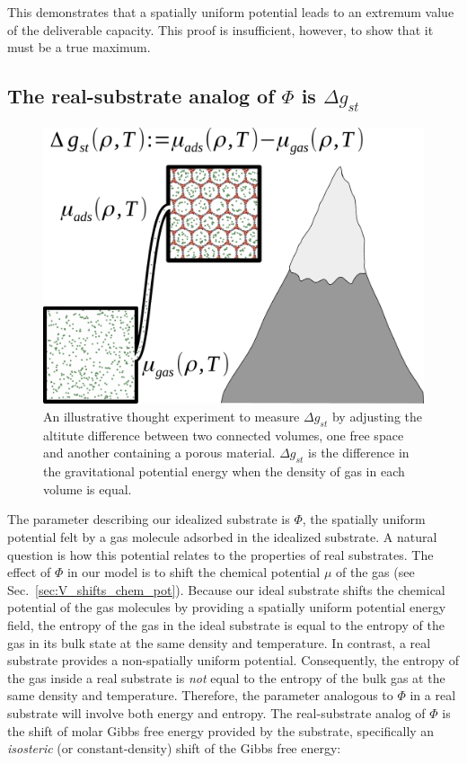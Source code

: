 \documentclass[twoside,twocolumn,9pt]{article}
\newcommand\V{\Phi}
\newcommand\gst{\ensuremath{\Delta g_{st}}}
\begin{document}
This demonstrates that a spatially uniform potential leads to an extremum value
of the deliverable capacity. This proof is insufficient, however, to show that
it must be a true maximum.

\subsection{The real-substrate analog of $\V$ is $\gst$}
\label{sec:phi-is-delta-g}
\begin{figure}
    \centering
    \includegraphics[width=\columnwidth]{g_st_simple.pdf}
    \caption{An illustrative thought experiment to measure $\gst$ by adjusting the altitute difference between two connected volumes, one free space and another containing a porous material.
    $\gst$ is the difference in the gravitational potential energy when the density of gas in each volume is equal.
    }
    \label{fig:delta-G-cartoon}
\end{figure}

The parameter describing our idealized substrate is $\V$, the spatially uniform
potential felt by a gas molecule adsorbed in the idealized substrate. A natural
question is how this potential relates to the properties of real substrates.
The effect of $\V$ in our model is to shift the chemical potential $\mu$ of the
gas (see Sec.~\ref{sec:V_shifts_chem_pot}). Because our ideal substrate shifts
the chemical potential of the gas molecules by providing a spatially uniform
potential energy field, the entropy of the gas in the ideal substrate is equal
to the entropy of the gas in its bulk state at the same density and
temperature. In contrast, a real substrate provides a non-spatially uniform
potential. Consequently, the entropy of the gas inside a real substrate is
\emph{not} equal to the entropy of the bulk gas at the same density and
temperature. Therefore, the parameter analogous to $\V$ in a real substrate
will involve both energy and entropy. The real-substrate analog of $\V$ is the
shift of molar Gibbs free energy provided by the substrate, specifically an
\emph{isosteric} (or constant-density) shift of the Gibbs free energy:
\end{document}
